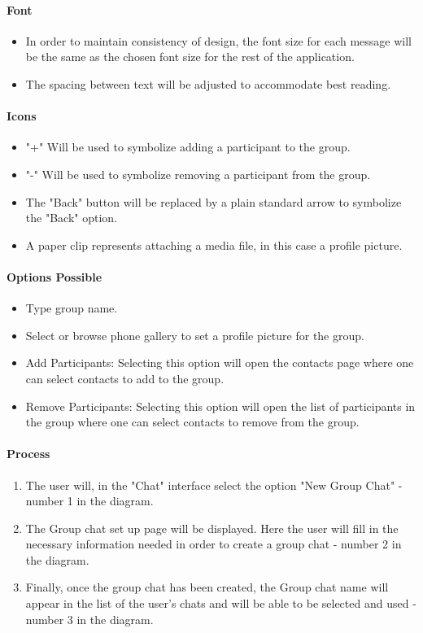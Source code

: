 \documentclass[11pt]{article}
\begin{document}
\paragraph{Font}
\begin{itemize}
\item	In order to maintain consistency of design, the font size for each message will be the same as the chosen font size for the rest of the application.
\item The spacing between text will be adjusted to accommodate best reading.\\
\end{itemize}

\paragraph{Icons}
\begin{itemize}
\item	"+" Will be used to symbolize adding a participant to the group.  
\item "-" Will be used to symbolize removing a participant from the group.
\item The "Back" button will be replaced by a plain standard arrow to symbolize the "Back" option. 
\item A paper clip represents attaching a media file, in this case a profile picture.  
\end{itemize}

\paragraph{Options Possible}
\begin{itemize}
\item Type group name.
\item Select or browse phone gallery to set a profile picture for the group.
\item	Add Participants: Selecting this option will open the contacts page where one can select contacts to add to the group.
\item 	Remove Participants: Selecting this option will open the list of participants in the group where one can select contacts to remove from the group.
\end{itemize}

\paragraph{Process}
\begin{enumerate}
\item The user will, in the "Chat" interface select the option "New Group Chat" - number 1 in the diagram.
\item The Group chat set up page will be displayed. Here the user will fill in the necessary information needed in order to create a group chat - number 2 in the diagram.
\item Finally, once the group chat has been created, the Group chat name will appear in the list of the user's chats and will be able to be selected and used - number 3 in the diagram.
\end{enumerate}
\end{document}
